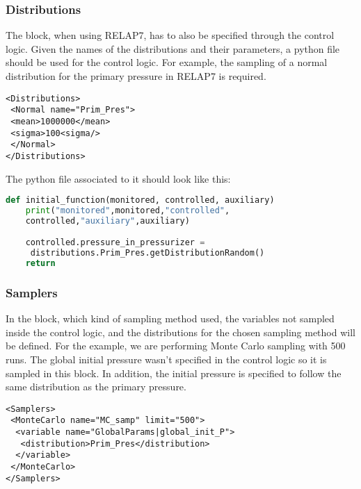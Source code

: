 \subsubsection{Distributions}
The  block, when using RELAP7, has to also be specified
through the control logic.
%
Given the names of the distributions and their parameters, a python file should
be used for the control logic.
%
For example, the sampling of a normal distribution for the primary pressure in
RELAP7 is required.
%
\begin{lstlisting}[style=XML]
<Distributions>
 <Normal name="Prim_Pres">
 <mean>1000000</mean>
 <sigma>100<sigma/>
 </Normal>
</Distributions>
\end{lstlisting}

The python file associated to it should look like this:
\begin{lstlisting}[language=Python]
def initial_function(monitored, controlled, auxiliary)
    print("monitored",monitored,"controlled",
    controlled,"auxiliary",auxiliary)

    controlled.pressure_in_pressurizer =
     distributions.Prim_Pres.getDistributionRandom()
    return
\end{lstlisting}
\subsubsection{Samplers}
In the  block, which kind of sampling method used, the
variables not sampled inside the control logic, and the distributions for the
chosen sampling method will be defined.
%
For the example, we are performing Monte Carlo sampling with 500 runs.
%
The global initial pressure wasn't specified in the control logic so it is
sampled in this block.
%
In addition, the initial pressure is specified to follow the same distribution
as the primary pressure.
%
\begin{lstlisting}[style=XML]
<Samplers>
 <MonteCarlo name="MC_samp" limit="500">
  <variable name="GlobalParams|global_init_P">
   <distribution>Prim_Pres</distribution>
  </variable>
 </MonteCarlo>
</Samplers>
\end{lstlisting}


